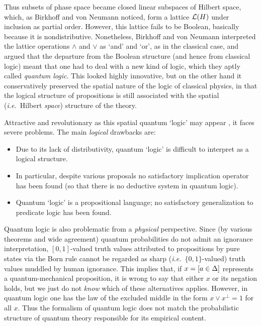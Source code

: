 \documentclass[12pt]{article}
\newcommand{\ie}{\textit{i.e.}}
\begin{document}
Thus subsets of phase space became closed linear subspaces of Hilbert space,
 which, as Birkhoff and von Neumann \cite{birkhoffvonneumann36}
noticed,  form a  lattice ${\mathcal L}(H)$
under inclusion as partial order. However, this lattice fails to be Boolean, basically because it is nondistributive.
Nonetheless, Birkhoff and von Neumann interpreted the lattice
operations $\wedge$ and $\vee$  as `and' and `or', as in the
classical case, and argued that the departure from the Boolean
structure (and hence from classical logic) meant that one had to deal
with a new kind of logic, which they aptly called {\it quantum
logic}. This looked highly innovative, but on the other hand it
conservatively preserved the spatial nature of the logic of classical
physics, in that the logical structure of propositions is still
associated with the spatial (\ie\ Hilbert {\it space}) structure of the
theory.

Attractive and revolutionary as this spatial quantum `logic' may appear
\cite{Varadarajan,kalmbach1,kalmbach2,redei}, it
faces severe problems. The main {\it logical} drawbacks are:
\begin{itemize}
\item Due to its lack of distributivity, quantum
`logic' is difficult to interpret as a logical structure.
\item In particular, despite various proposals no satisfactory implication operator has been found (so that there is no deductive system in quantum logic).
\item Quantum `logic' is a propositional language;
no satisfactory generalization to  predicate logic has been found.
\end{itemize}

Quantum logic is also problematic from
a {\it physical} perspective. Since (by various
theorems \cite{Bub} and wide agreement) quantum probabilities do not
admit an ignorance interpretation,  $[0,1]$-valued truth values
attributed to propositions by pure states via the Born rule cannot be
regarded as sharp (\ie\ $\{0,1\}$-valued) truth values muddled by human
ignorance. This implies that, if $x=[a\in\Delta]$ represents  a
quantum-mechanical proposition, it is wrong to say that either $x$ or
its negation holds, but we just do not {\it know} which of these
alternatives applies. However, in quantum logic one has
the law of the excluded middle in the form $x\vee x^{\perp}=1$
for all $x$.
Thus the formalism of quantum logic does not match the probabilistic
structure of quantum theory responsible for its empirical
content.
\end{document}
